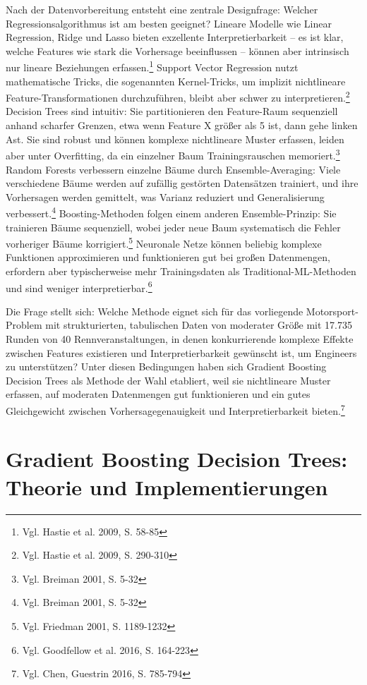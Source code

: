 Nach der Datenvorbereitung entsteht eine zentrale Designfrage: Welcher Regressionsalgorithmus ist am besten geeignet? Lineare Modelle wie Linear Regression, Ridge und Lasso bieten exzellente Interpretierbarkeit – es ist klar, welche Features wie stark die Vorhersage beeinflussen – können aber intrinsisch nur lineare Beziehungen erfassen.\footnote{Vgl. Hastie et al. 2009, S. 58-85} Support Vector Regression nutzt mathematische Tricks, die sogenannten Kernel-Tricks, um implizit nichtlineare Feature-Transformationen durchzuführen, bleibt aber schwer zu interpretieren.\footnote{Vgl. Hastie et al. 2009, S. 290-310} Decision Trees sind intuitiv: Sie partitionieren den Feature-Raum sequenziell anhand scharfer Grenzen, etwa wenn Feature X größer als 5 ist, dann gehe linken Ast. Sie sind robust und können komplexe nichtlineare Muster erfassen, leiden aber unter Overfitting, da ein einzelner Baum Trainingsrauschen memoriert.\footnote{Vgl. Breiman 2001, S. 5-32} Random Forests verbessern einzelne Bäume durch Ensemble-Averaging: Viele verschiedene Bäume werden auf zufällig gestörten Datensätzen trainiert, und ihre Vorhersagen werden gemittelt, was Varianz reduziert und Generalisierung verbessert.\footnote{Vgl. Breiman 2001, S. 5-32} Boosting-Methoden folgen einem anderen Ensemble-Prinzip: Sie trainieren Bäume sequenziell, wobei jeder neue Baum systematisch die Fehler vorheriger Bäume korrigiert.\footnote{Vgl. Friedman 2001, S. 1189-1232} Neuronale Netze können beliebig komplexe Funktionen approximieren und funktionieren gut bei großen Datenmengen, erfordern aber typischerweise mehr Trainingsdaten als Traditional-ML-Methoden und sind weniger interpretierbar.\footnote{Vgl. Goodfellow et al. 2016, S. 164-223}

Die Frage stellt sich: Welche Methode eignet sich für das vorliegende Motorsport-Problem mit strukturierten, tabulischen Daten von moderater Größe mit 17.735 Runden von 40 Rennveranstaltungen, in denen konkurrierende komplexe Effekte zwischen Features existieren und Interpretierbarkeit gewünscht ist, um Engineers zu unterstützen? Unter diesen Bedingungen haben sich Gradient Boosting Decision Trees als Methode der Wahl etabliert, weil sie nichtlineare Muster erfassen, auf moderaten Datenmengen gut funktionieren und ein gutes Gleichgewicht zwischen Vorhersagegenauigkeit und Interpretierbarkeit bieten.\footnote{Vgl. Chen, Guestrin 2016, S. 785-794}



\section{Gradient Boosting Decision Trees: Theorie und Implementierungen}

